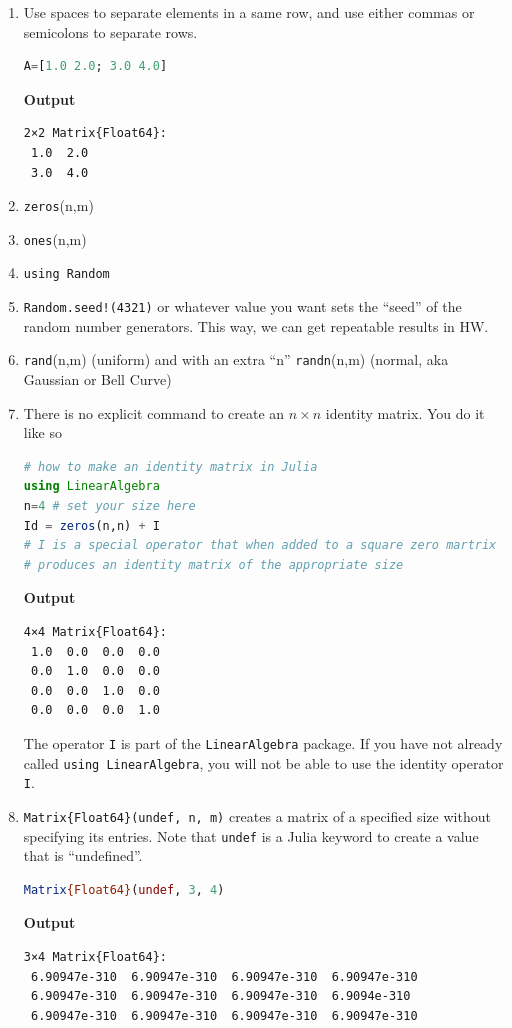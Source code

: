 \begin{enumerate}
        \renewcommand{\labelenumi}{(\alph{enumi})}
        \setlength{\itemsep}{.1cm}
    \item Use spaces to separate elements in a same row, and use either commas or semicolons to separate rows.
    \begin{lstlisting}[language=Julia,style=mystyle]
A=[1.0 2.0; 3.0 4.0]
\end{lstlisting}
\textbf{Output} 
\begin{verbatim}
2×2 Matrix{Float64}:
 1.0  2.0
 3.0  4.0
\end{verbatim}

\item \texttt{zeros}(n,m)
\item \texttt{ones}(n,m)
\item \texttt{using Random}
\item \texttt{Random.seed!(4321)} or whatever value you want sets the ``seed'' of the random number generators. This way, we can get repeatable results in HW.
\item  \texttt{rand}(n,m) (uniform) and with an extra ``n'' \texttt{randn}(n,m) (normal, aka Gaussian or Bell Curve)
\item There is no explicit command to create an $n \times n$ identity matrix. You do it like so
\begin{lstlisting}[language=Julia,style=mystyle]
# how to make an identity matrix in Julia
using LinearAlgebra
n=4 # set your size here
Id = zeros(n,n) + I
# I is a special operator that when added to a square zero martrix 
# produces an identity matrix of the appropriate size
\end{lstlisting}
\textbf{Output} 
\begin{verbatim}
4×4 Matrix{Float64}:
 1.0  0.0  0.0  0.0
 0.0  1.0  0.0  0.0
 0.0  0.0  1.0  0.0
 0.0  0.0  0.0  1.0
\end{verbatim}

The operator \texttt{I} is part of the \texttt{LinearAlgebra} package. If you have not already called \texttt{using LinearAlgebra}, you will not be able to use the identity operator \texttt{I}. 

\item  \texttt{Matrix\{Float64\}(undef, n, m)} creates a matrix of a specified size without specifying its entries. Note that \texttt{undef} is a Julia keyword to create a value that is ``undefined''.\\

\begin{lstlisting}[language=Julia,style=mystyle]
Matrix{Float64}(undef, 3, 4)
\end{lstlisting}
\textbf{Output} 
\begin{verbatim}
3×4 Matrix{Float64}:
 6.90947e-310  6.90947e-310  6.90947e-310  6.90947e-310
 6.90947e-310  6.90947e-310  6.90947e-310  6.9094e-310
 6.90947e-310  6.90947e-310  6.90947e-310  6.90947e-310
\end{verbatim}


\end{enumerate}

